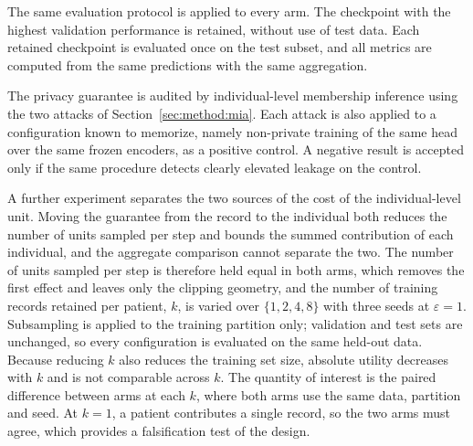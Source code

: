 The same evaluation protocol is applied to every arm. The checkpoint with the
highest validation performance is retained, without use of test data. Each
retained checkpoint is evaluated once on the test subset, and all metrics are
computed from the same predictions with the same aggregation.

The privacy guarantee is audited by individual-level membership inference
using the two attacks of Section~\ref{sec:method:mia}. Each attack is also
applied to a configuration known to memorize, namely non-private training of
the same head over the same frozen encoders, as a positive control. A negative
result is accepted only if the same procedure detects clearly elevated leakage
on the control.

A further experiment separates the two sources of the cost of the
individual-level unit. Moving the guarantee from the record to the individual
both reduces the number of units sampled per step and bounds the summed
contribution of each individual, and the aggregate comparison cannot separate
the two. The number of units sampled per step is therefore held equal in both
arms, which removes the first effect and leaves only the clipping geometry,
and the number of training records retained per patient, $k$, is varied over
$\{1, 2, 4, 8\}$ with three seeds at $\varepsilon = 1$. Subsampling is applied
to the training partition only; validation and test sets are unchanged, so
every configuration is evaluated on the same held-out data. Because reducing
$k$ also reduces the training set size, absolute utility decreases with $k$ and
is not comparable across $k$. The quantity of interest is the paired difference
between arms at each $k$, where both arms use the same data, partition and
seed. At $k = 1$, a patient contributes a single record, so the two arms must
agree, which provides a falsification test of the design.
